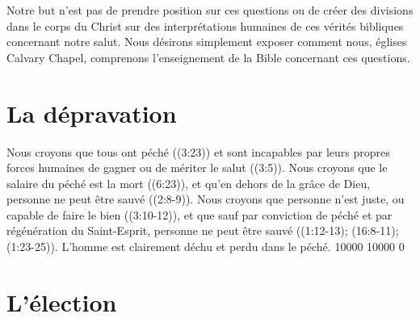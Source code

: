 
\begin{pocketpar}{}
Notre but n'est pas de prendre position sur ces questions
  ou de créer des \pocketlinebreak
 divisions dans le corps du Christ
 sur des interprétations humaines de ces vérités bibliques
 concernant notre salut.
 Nous désirons simplement exposer comment nous,
 églises Calvary Chapel, comprenons l'en\-sei\-gnement de la Bible
 concernant ces questions.
\end{pocketpar}
 
\section*{La dépravation}

Nous croyons que tous ont péché
 ((3:23)) et
 sont incapables par leurs propres forces humaines de gagner ou
 de mériter le salut ((3:5)).
 Nous croyons que le
 salaire du péché est la mort ((6:23)),
 et qu'en dehors de la grâce de Dieu, personne ne peut être sauvé
 ((2:8-9)).
 Nous cro\-yons que personne n'est juste, ou
 capable de faire le bien
 ((3:10-12)), et que sauf par
 conviction de péché et par régénération du Saint-Esprit, personne ne peut être sauvé
 ((1:12-13);
 (16:8-11);
 (1:23-25)).
 L'homme est clairement déchu et perdu dans le péché.
 \begingroup{} 10000 10000 0
 \par\endgroup


\section*{L'élection}

